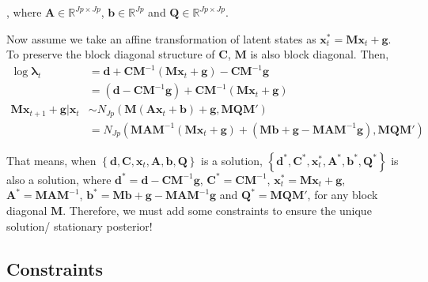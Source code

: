 \documentclass[]{article}
\begin{document}
, where \(\mathbf{A} \in \mathbb{R}^{Jp \times Jp}\),
\(\mathbf{b} \in \mathbb{R}^{Jp}\) and
\(\mathbf{Q} \in \mathbb{R}^{Jp \times Jp}\).

Now assume we take an affine transformation of latent states as
\(\mathbf{x}_{t}^{*} = \mathbf{M}\mathbf{x}_{t} + \mathbf{g}\). To
preserve the block diagonal structure of \(\mathbf{C}\), \(\mathbf{M}\)
is also block diagonal. Then,
\begin{align*}
	\log\bm{\lambda}_{t} &= \mathbf{d} + \mathbf{C}\mathbf{M}^{- 1}\left( \mathbf{M}\mathbf{x}_{t} + \mathbf{g} \right) - \mathbf{C}\mathbf{M}^{- 1}\mathbf{g}\\
	&= \left( \mathbf{d} - \mathbf{C}\mathbf{M}^{- 1}\mathbf{g} \right) + \mathbf{C}\mathbf{M}^{- 1}(\mathbf{M}\mathbf{x}_{t} + \mathbf{g})\\
	\mathbf{M}\mathbf{x}_{t + 1} + \mathbf{g}|\mathbf{x}_{t} &\sim N_{Jp}\left( \mathbf{M}\left( \mathbf{A}\mathbf{x}_{t} + \mathbf{b} \right)+\mathbf{g}, \mathbf{MQM}' \right)\\
	&= N_{Jp}(\mathbf{MAM}^{- 1}\left( \mathbf{M}\mathbf{x}_{t} + \mathbf{g} \right) + \left( \mathbf{Mb} + \mathbf{g} - \mathbf{MAM}^{- 1}\mathbf{g} \right), \mathbf{MQM}')
\end{align*}

That means, when \(\left\{ \mathbf{d},\mathbf{C},\mathbf{x}_t,\mathbf{A},\mathbf{b},\mathbf{Q} \right\}\) is a solution,
\(\left\{ \mathbf{d}^*,\mathbf{C}^*,\mathbf{x}^*_t,\mathbf{A}^*,\mathbf{b}^*,\mathbf{Q}^* \right\}\) is also a
solution, where
\(\mathbf{d}^* = \mathbf{d} - \mathbf{C}\mathbf{M}^{- 1}\mathbf{g}\),
\(\mathbf{C}^* = \mathbf{CM}^{- 1}\), \(\mathbf{x}_{t}^{*} = \mathbf{M}\mathbf{x}_{t} + \mathbf{g}\),
\(\mathbf{A}^* = \mathbf{MAM}^{- 1}\),
\(\mathbf{b}^* = \mathbf{Mb} + \mathbf{g} - \mathbf{MAM}^{- 1}\mathbf{g}\)
and \(\mathbf{Q}^* = \mathbf{MQM}'\), for any block diagonal \(\mathbf{M}\). Therefore, we must add some constraints to ensure the unique solution/ stationary
posterior!

\subsection{Constraints}

\end{document}
